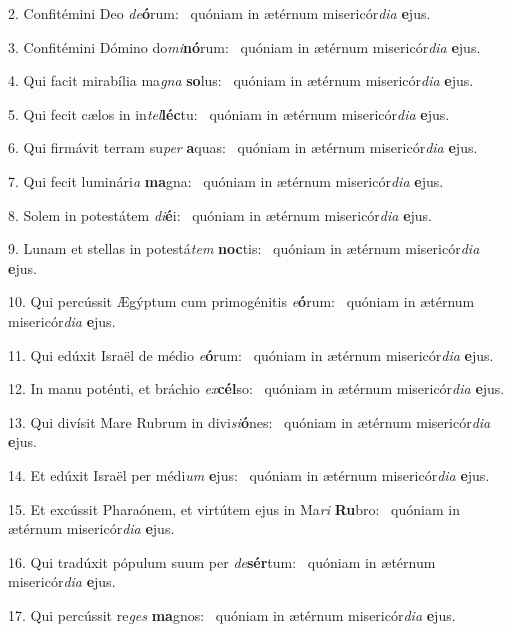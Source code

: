 2. Confitémini Deo \textit{de}\textbf{ó}rum: \ast\  quóniam in ætérnum misericór\textit{di}\textit{a} \textbf{e}jus.\

3. Confitémini Dómino do\textit{mi}\textbf{nó}rum: \ast\  quóniam in ætérnum misericór\textit{di}\textit{a} \textbf{e}jus.\

4. Qui facit mirabília ma\textit{gna} \textbf{so}lus: \ast\  quóniam in ætérnum misericór\textit{di}\textit{a} \textbf{e}jus.\

5. Qui fecit cælos in in\textit{tel}\textbf{léc}tu: \ast\  quóniam in ætérnum misericór\textit{di}\textit{a} \textbf{e}jus.\

6. Qui firmávit terram su\textit{per} \textbf{a}quas: \ast\  quóniam in ætérnum misericór\textit{di}\textit{a} \textbf{e}jus.\

7. Qui fecit luminári\textit{a} \textbf{ma}gna: \ast\  quóniam in ætérnum misericór\textit{di}\textit{a} \textbf{e}jus.\

8. Solem in potestátem \textit{di}\textbf{é}i: \ast\  quóniam in ætérnum misericór\textit{di}\textit{a} \textbf{e}jus.\

9. Lunam et stellas in potestá\textit{tem} \textbf{noc}tis: \ast\  quóniam in ætérnum misericór\textit{di}\textit{a} \textbf{e}jus.\

10. Qui percússit Ægýptum cum primogénitis \textit{e}\textbf{ó}rum: \ast\  quóniam in ætérnum misericór\textit{di}\textit{a} \textbf{e}jus.\

11. Qui edúxit Israël de médio \textit{e}\textbf{ó}rum: \ast\  quóniam in ætérnum misericór\textit{di}\textit{a} \textbf{e}jus.\

12. In manu poténti, et bráchio \textit{ex}\textbf{cél}so: \ast\  quóniam in ætérnum misericór\textit{di}\textit{a} \textbf{e}jus.\

13. Qui divísit Mare Rubrum in divi\textit{si}\textbf{ó}nes: \ast\  quóniam in ætérnum misericór\textit{di}\textit{a} \textbf{e}jus.\

14. Et edúxit Israël per médi\textit{um} \textbf{e}jus: \ast\  quóniam in ætérnum misericór\textit{di}\textit{a} \textbf{e}jus.\

15. Et excússit Pharaónem, et virtútem ejus in Ma\textit{ri} \textbf{Ru}bro: \ast\  quóniam in ætérnum misericór\textit{di}\textit{a} \textbf{e}jus.\

16. Qui tradúxit pópulum suum per \textit{de}\textbf{sér}tum: \ast\  quóniam in ætérnum misericór\textit{di}\textit{a} \textbf{e}jus.\

17. Qui percússit re\textit{ges} \textbf{ma}gnos: \ast\  quóniam in ætérnum misericór\textit{di}\textit{a} \textbf{e}jus.\

